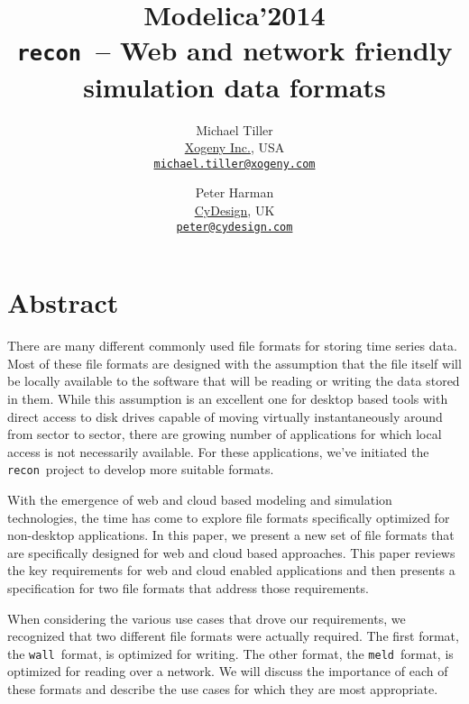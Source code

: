 \documentclass[11pt,a4paper,onecolumn]{article}
\newcommand{\recon}{\texttt{recon}}
\newcommand{\wall}{\texttt{wall}}
\newcommand{\meld}{\texttt{meld}}
\begin{document}
\title{\textbf{{\small Modelica'2014}\\
    \recon\  -- Web and network friendly simulation data formats}}

\author{Michael Tiller\\
  \href{http://xogeny.com}{Xogeny Inc.}, USA\\
  \href{mailto:michael.tiller@xogeny.com}
       {\nolinkurl{michael.tiller@xogeny.com}}
  \and Peter Harman\\
  \href{http://www.cydesign.com}
       {CyDesign}, UK\\
  \href{mailto:peter@cydesign.com}{\nolinkurl{peter@cydesign.com}}}
\date{} %
\maketitle\thispagestyle{empty} %

\section*{Abstract}

There are many different commonly used file formats for storing time
series data.  Most of these file formats are designed with the
assumption that the file itself will be locally available to the
software that will be reading or writing the data stored in them.
While this assumption is an excellent one for desktop based tools with
direct access to disk drives capable of moving virtually
instantaneously around from sector to sector, there are growing number
of applications for which local access is not necessarily available.
For these applications, we've initiated the \recon\ project to develop
more suitable formats.

With the emergence of web and cloud based modeling and simulation
technologies, the time has come to explore file formats specifically
optimized for non-desktop applications.  In this paper, we present a
new set of file formats that are specifically designed for web and
cloud based approaches.  This paper reviews the key requirements for
web and cloud enabled applications and then presents a specification
for two file formats that address those requirements.

When considering the various use cases that drove our requirements, we
recognized that two different file formats were actually required.
The first format, the \wall\ format, is optimized for writing.  The
other format, the \meld\ format, is optimized for reading over a
network.  We will discuss the importance of each of these formats and
describe the use cases for which they are most appropriate.
\end{document}
